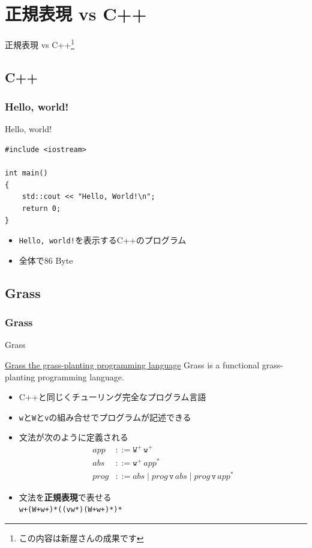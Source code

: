 \documentclass[12pt, unicode, svgnames, handout]{beamer}
\begin{document}
\section{正規表現 vs C++}
\begin{frame}
  \centering
  {\Huge 正規表現 vs C++\footnote[frame]{この内容は新屋さんの成果です}}
\end{frame}

\subsection{C++}
\begin{frame}[fragile]
  \frametitle{Hello, world!}

  \begin{exampleblock}{Hello, world!}
\begin{lstlisting}[style=cpp]
#include <iostream>

int main()
{
    std::cout << "Hello, World!\n";
    return 0;
}
\end{lstlisting}
  \end{exampleblock}

  \begin{itemize}
    \item<2-> \texttt{Hello, world!}を表示するC++のプログラム
    \item<3-> 全体で86 Byte
  \end{itemize}

\end{frame}

\subsection{Grass}
\begin{frame}[fragile]
  \frametitle{Grass}

  \begin{block}{Grass}
    \begin{shadequote}[r]{\scriptsize\href{http://www.blue.sky.or.jp/grass/}{Grass the grass-planting programming language}}
      Grass is a functional grass-planting programming language.
    \end{shadequote}
  \end{block}

  \begin{itemize}
    \item<2-> C++と同じくチューリング完全なプログラム言語
    \item<3-> \texttt{w}と\texttt{W}と\texttt{v}の組み合せでプログラムが記述できる
    \item<4-> 文法が次のように定義される
      \begin{align*}
        app &::= \mathtt{W}^+\, \mathtt{w}^+ \\
        abs &::= \mathtt{w}^+\, app^* \\
        prog &::= abs \mid prog\, \mathtt{v}\, abs \mid prog\, \mathtt{v}\, app^* 
      \end{align*}
    \item<5-> 文法を\textbf{正規表現}で表せる \\
      \lstinline{w+(W+w+)*((vw*)(W+w+)*)*}
  \end{itemize}
\end{frame}
\end{document}
